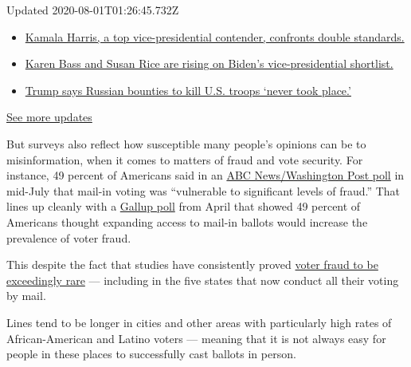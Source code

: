 Updated 2020-08-01T01:26:45.732Z

\begin{itemize}
\tightlist
\item
  \href{https://www.nytimes.com/2020/07/31/us/elections/biden-vs-trump.html?action=click\&pgtype=Article\&state=default\&region=MAIN_CONTENT_1\&context=storylines_live_updates\#link-29fdff45}{Kamala
  Harris, a top vice-presidential contender, confronts double
  standards.}
\item
  \href{https://www.nytimes.com/2020/07/31/us/elections/biden-vs-trump.html?action=click\&pgtype=Article\&state=default\&region=MAIN_CONTENT_1\&context=storylines_live_updates\#link-13ec3d9c}{Karen
  Bass and Susan Rice are rising on Biden's vice-presidential
  shortlist.}
\item
  \href{https://www.nytimes.com/2020/07/31/us/elections/biden-vs-trump.html?action=click\&pgtype=Article\&state=default\&region=MAIN_CONTENT_1\&context=storylines_live_updates\#link-49e9a016}{Trump
  says Russian bounties to kill U.S. troops `never took place.'}
\end{itemize}

\href{https://www.nytimes.com/2020/07/31/us/elections/biden-vs-trump.html?action=click\&pgtype=Article\&state=default\&region=MAIN_CONTENT_1\&context=storylines_live_updates}{See
more updates}

But surveys also reflect how susceptible many people's opinions can be
to misinformation, when it comes to matters of fraud and vote security.
For instance, 49 percent of Americans said in an
\href{https://www.langerresearch.com/wp-content/uploads/1214a22020Election.pdf}{ABC
News/Washington Post poll} in mid-July that mail-in voting was
``vulnerable to significant levels of fraud.'' That lines up cleanly
with a
\href{https://news.gallup.com/poll/310586/americans-favor-voting-mail-option-november.aspx}{Gallup
poll} from April that showed 49 percent of Americans thought expanding
access to mail-in ballots would increase the prevalence of voter fraud.

This despite the fact that studies have consistently proved
\href{https://www.nytimes.com/article/mail-in-voting-explained.html?action=click\&module=RelatedLinks\&pgtype=Article}{voter
fraud to be exceedingly rare} --- including in the five states that now
conduct all their voting by mail.

Lines tend to be longer in cities and other areas with particularly high
rates of African-American and Latino voters --- meaning that it is not
always easy for people in these places to successfully cast ballots in
person.

